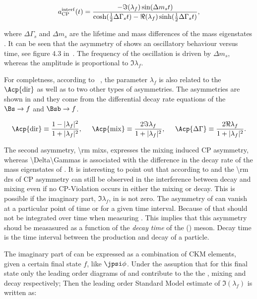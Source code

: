 \newcommand{\half}{\frac{1}{2}}
\begin{equation}
  \centering
  a_{\rm CP}^{\rm interf}(t) = \frac{ - \Im(\lambda_f) \sin(\Delta m_s t)} {\cosh(\half \Delta\Gamma_s t) - \Re(\lambda_f)\sinh(\half\Delta\Gamma_s t)},
\label{cpv_interf}
\end{equation}

\noindent where $\Delta\Gamma_s$ and $\Delta m_s$ are the lifetime and mass differences of the mass eigenstates .
It can be seen that the asymmetry of  shows an oscillatory behaviour versus time, see figure 4.3 in~\cite{jeroenThesis}.
The frequency of the oscillation is driven by $\Delta m_s$, whereas the amplitude is proportional to $\Im\lambda_f$.

For completness, according to ~\cite{DeBruyn-thesis,jeroenThesis}, the parameter $\lambda_f$ is also related to the $\Acp{\rm dir}$ as well as to two
other types of asymmetries. The asymmetries are shown in  and they come from the differential decay rate equations of the $\Bs\to f$
 and $\Bsb\to f$.

\begin{equation}
  \centering
  \Acp{\rm dir}      \equiv \frac{ 1-|\lambda_f|^2} {1 + |\lambda_f|^2},\;\;\;\;\;
  \Acp{\rm mix}      \equiv \frac{ 2 \Im\lambda_f} {1 + |\lambda_f|^2},\;\;\;\;\;
  \Acp{\Delta\Gamma} \equiv \frac{ 2 \Re\lambda_f} {1 + |\lambda_f|^2}.
\label{cp_asym_lambda}
\end{equation}

The second asymmetry, \Acp{\rm mix}, expresses the mixing induced CP asymmetry, whereas \Acp{\Delta\Gamma} is associated with the
difference in the decay rate of the mass eigenstates of . It is interesting to point out that according
to  and the \Acp{\rm dr} of  CP asymmetry can still be observed in the interference between decay and
mixing even if no CP-Violation occurs in either the mixing or decay. This is possible if the imaginary part, $\Im\lambda_f$, in  is not zero.
The asymmetry of  can vanish at a particular point of time or for a given time interval. Because of that  should not
be integrated over time when measuring \phis. This implies that this asymmetry shoud be measasured as a function of the
{\it decay time} of the \Bs (\Bsb) meson. Decay time is the time interval between the production and decay of a particle.

The imaginary part of  can be expressed as a combination of CKM elements, given a certain final state $f$, like $\jpsi\phi$.
Under the assuption that for this final state only the leading order diagrams of  and  contribute to the
the \Bs, \Bsb mixing and decay respectively; Then the leading order Standard Model estimate of $\Im(\lambda_f)$ is written as:

